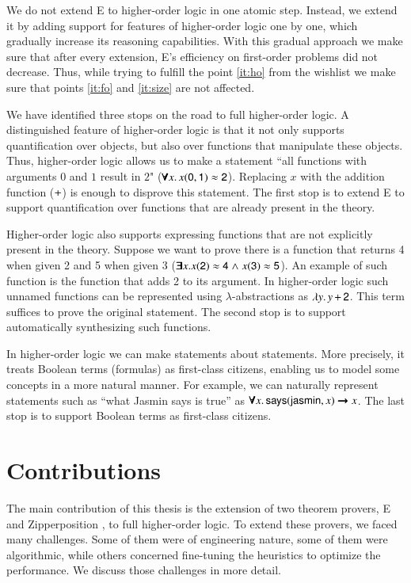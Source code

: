 We do not extend E to higher-order logic in one atomic step. Instead, we extend
it by adding support for features of higher-order logic one by one,
which gradually increase its reasoning capabilities. With this gradual
approach we make sure that after every extension, E's
efficiency on first-order problems did not decrease. Thus, while trying
to fulfill the point \ref{it:ho} from the wishlist we make sure that points
\ref{it:fo} and \ref{it:size} are not affected.

We have identified three stops on the road to full higher-order logic. A
distinguished feature of higher-order logic is that it not only supports
quantification over objects, but also over functions that manipulate these
objects. Thus, higher-order logic allows us to make a statement ``all functions
with arguments $0$ and $1$ result in $2$" ($\pmb{\forall} x. \,  x (\mathsf{0}, \mathsf{1}) \approx
\mathsf{2}$). Replacing $x$ with the addition function ($\mathsf{+}$) is enough to
disprove this statement. The first stop is to extend E to support
quantification over functions that are already present in the theory.

Higher-order logic also supports expressing functions that are not explicitly
present in the theory. Suppose we want to prove there is a
function that returns 4 when given 2 and 5 when given 3 ($\pmb{\exists} x. x(\mathsf{2})
\approx \mathsf{4} \mathrel\land x (\mathsf{3}) \approx \mathsf{5} $). An example of such function is
the function that adds 2 to its argument. In higher-order logic such unnamed
functions can be represented using $\lambda$-abstractions as $\lambda y.\, y \,
\mathsf{+} \, \mathsf{2}$. This term suffices to prove the original statement. The
second stop is to support automatically synthesizing such functions.

In higher-order logic we can make statements about statements. More precisely,
it treats Boolean terms (formulas) as first-class citizens, enabling us to
model some concepts in a more natural manner. For example, we can naturally
represent statements such as ``what Jasmin says is true'' as $\pmb{\forall} x. \,
\mathsf{says}(\mathsf{jasmin}, x) \pmb{\rightarrow} x$. The last stop is to support Boolean terms
as first-class citizens.
\pagebreak[2]

\section{Contributions}

The main contribution of this thesis is the extension of two theorem provers,
E and Zipperposition \cite{sc-15-simon-phd}, to full higher-order logic. To
extend these provers, we faced many challenges. Some of them were of engineering
nature, some of them were algorithmic, while others concerned fine-tuning the
heuristics to optimize the performance. We discuss those challenges in more detail.

